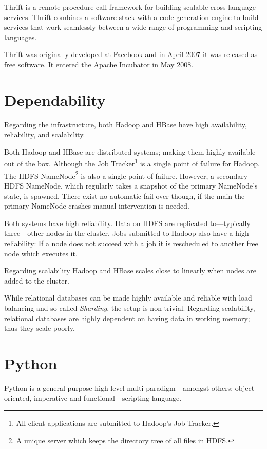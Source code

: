 Thrift is a remote procedure call framework for building scalable cross-language
services. Thrift combines a software stack with a code generation engine to
build services that work seamlessly between a wide range of programming and
scripting languages.

Thrift was originally developed at Facebook and in April 2007 it was released as
free software. It entered the Apache Incubator in May 2008. \cite{thrift}


\section{Dependability}

Regarding the infrastructure, both Hadoop and HBase have high availability,
reliability, and scalability.

Both Hadoop and HBase are distributed systems; making them highly available out
of the box. Although the Job Tracker\footnote{All client applications are
submitted to Hadoop's Job Tracker.} is a single point of failure for Hadoop.
The HDFS NameNode\footnote{A unique server which keeps the directory tree of all
files in HDFS.} is also a single point of failure. However, a secondary HDFS
NameNode, which regularly takes a snapshot of the primary NameNode's state, is
spawned. There exist no automatic fail-over though, if the main the primary
NameNode crashes manual intervention is needed.

Both systems have high reliability. Data on HDFS are replicated to---typically
three---other nodes in the cluster. Jobs submitted to Hadoop also have a high
reliability: If a node does not succeed with a job it is rescheduled to another
free node which executes it.

Regarding scalability Hadoop and HBase scales close to linearly when nodes are
added to the cluster.

While relational databases can be made highly available and reliable with load
balancing and so called \textit{Sharding}, the setup is non-trivial. Regarding
scalability, relational databases are highly dependent on having data in working
memory; thus they scale poorly.



\section{Python}

Python is a general-purpose high-level multi-paradigm---amongst others:
object-oriented, imperative and functional---scripting language.
\cite{python}

